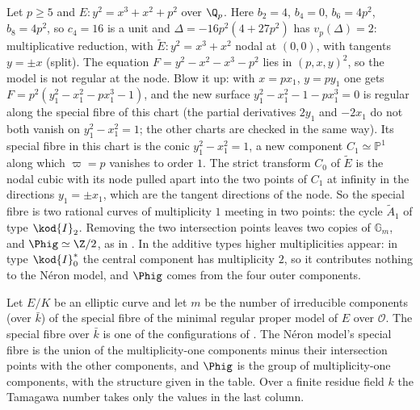 \begin{example}\label{ex:reduction:blowup}
Let $p\ge5$ and $E\colon y^2=x^3+x^2+p^2$ over $\Q_p$. Here $b_2=4$, $b_4=0$, $b_6=4p^2$, $b_8=4p^2$, so $c_4=16$ is a unit and
$\Delta=-16p^2(4+27p^2)$ has $v_p(\Delta)=2$: multiplicative reduction, with $\tilde E\colon y^2=x^3+x^2$ nodal at $(0,0)$, with tangents
$y=\pm x$ (split). The equation $F=y^2-x^2-x^3-p^2$ lies in $(p,x,y)^2$, so the model is not regular at the node. Blow it up:
with $x=px_1$, $y=py_1$ one gets $F=p^2(y_1^2-x_1^2-px_1^3-1)$, and the new surface $y_1^2-x_1^2-1-px_1^3=0$ is regular along the
special fibre of this chart (the partial derivatives $2y_1$ and $-2x_1$ do not both vanish on $y_1^2-x_1^2=1$; the other charts
are checked in the same way). Its special
fibre in this chart is the conic $y_1^2-x_1^2=1$, a new component $C_1\simeq\mathbb P^1$ along which $\varpi=p$ vanishes to order $1$.
The strict transform $C_0$ of $\tilde E$ is the nodal cubic with its node pulled apart into the two points of $C_1$ at infinity in
the directions $y_1=\pm x_1$, which are the tangent directions of the node. So the special fibre is two rational curves of
multiplicity $1$ meeting in two points: the cycle $\tilde A_1$ of type $\kod{I}_2$. Removing the two intersection points leaves two
copies of $\mathbb G_m$, and $\Phig\simeq\Z/2$, as in . In the additive types higher multiplicities
appear: in type $\kod{I}_0^*$ the central component has multiplicity $2$, so it contributes nothing to the N\'eron model, and
$\Phig$ comes from the four outer components.
\end{example}

\begin{theorem}\label{thm:reduction:kodaira-neron}
Let $E/K$ be an elliptic curve and let $m$ be the number of irreducible components (over $\bar k$) of the special
fibre of the minimal regular proper model of $E$ over $\mathcal O$. The special fibre over $\bar k$ is one of the
configurations of . The N\'eron model's special fibre is the union of the
multiplicity-one components minus their intersection points with the other components, and $\Phig$ is
the group of multiplicity-one components, with the structure given in the table. Over a finite residue field
$k$ the Tamagawa number takes only the values in the last column.
\end{theorem}

